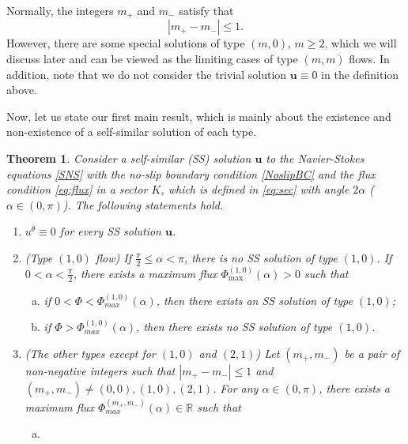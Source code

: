 \documentclass[reqno,12pt]{amsart}
\newtheorem{theorem}{Theorem}[section]
\newcommand{\Bu}{{\boldsymbol{u}}}
\begin{document}



Normally, the integers $m_{+}$ and $m_{-}$ satisfy that 
\begin{equation*}
    |m_{+}-m_{-}|\leq 1.
\end{equation*}
However, there are some special solutions of type $(m, 0)$, $m\geq 2$, which we will discuss later and can be viewed as the limiting cases of type $(m, m)$ flows.
In addition, note that we do not consider the trivial solution $\Bu \equiv 0$ in the definition above. 

Now, let us state our first main result, which is mainly about the existence and non-existence of a self-similar solution of each type. %
    \begin{theorem}\label{2Dresult_2}
  Consider a self-similar (SS) solution $\Bu$ to the Navier-Stokes equations \eqref{SNS} with the no-slip boundary condition \eqref{NoslipBC} and the flux condition \eqref{eq:flux} in a sector $K$, which  is defined in \eqref{eq:sec} with angle $2\alpha$ ($\alpha\in (0, \pi)$). The following statements hold.
    \begin{enumerate}
    \item 
    $u^\theta \equiv 0$ for every SS solution $\Bu$.
    \item (Type $(1,0)$ flow)
    If $\frac{\pi}{2}\leq \alpha < \pi$,  there is no SS solution of type $(1,0)$. If $0<\alpha<\frac{\pi}{2}$, there exists a maximum flux $\Phi_{\textrm{max}}^{(1,0)}(\alpha)>0$ such that 
        \begin{enumerate}[(a)]
            \item 
    if $0<\Phi< \Phi^{(1,0)}_{max}(\alpha)$, then there exists an SS solution of type $(1,0)$; 
        \item 
        if $\Phi> \Phi^{(1,0)}_{max}(\alpha)$, then there exists no SS solution of type $(1,0)$.
         \end{enumerate}
    \item 
    (The other types except for $(1,0)$ and $(2,1)$)
 {Let  $(m_+,m_-)$ be a pair of non-negative integers such that $|m_+-m_-|\leq 1$ and $(m_+,m_-)\not =(0,0),(1,0), (2,1)$. For any $\alpha \in (0, \pi)$,
there exists a maximum flux $\Phi_{max}^{(m_+,m_-)}(\alpha)\in \mathbb{R} $ such that }
    \begin{enumerate}[(a)]
        \item 

\end{enumerate}
\end{enumerate}
\end{theorem}
\end{document}
